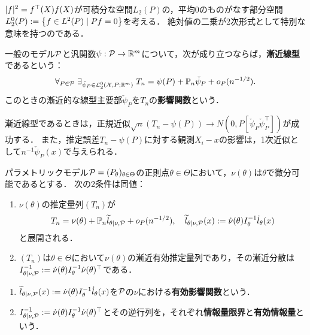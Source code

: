 \documentclass[uplatex,dvipdfmx]{jsreport}
\begin{document}
\begin{notation}
    $\abs{f}^2=f^\top(X) f(X)$が可積分な空間$L_2(P)$の，平均$0$のものがなす部分空間
    $L^0_2(P):=\Brace{f\in L^2(P)\mid Pf=0}$を考える．
    絶対値の二乗が2次形式として特別な意味を持つのである．
\end{notation}

\begin{definition}
    一般のモデル$\P$と汎関数$\psi:\P\to\R^m$について，次が成り立つならば，\textbf{漸近線型}であるという：
    \[\forall_{P\in\P}\;\exists_{\check{\psi}_P\in\L_2^0(\X,P;\R^m)}\;T_n=\psi(P)+\bP_n\check{\psi}_P+o_P(n^{-1/2}).\]
    このときの漸近的な線型主要部$\check{\psi}_P$を$T_n$の\textbf{影響関数}という．
\end{definition}
\begin{remarks}
    漸近線型であるときは，正規近似$\sqrt{n}(T_n-\psi(P))\to N(0,P[\check{\psi}_P\check{\psi}_P^\top])$が成功する．
    また，推定誤差$T_n-\psi(P)$に対する観測$X_i-x$の影響は，1次近似として$n^{-1}\check{\psi}_P(x)$で与えられる．
\end{remarks}

\begin{theorem}[パラメトリックモデルにおける漸近有効性の特徴付け]
    パラメトリックモデル$\P=(P_\theta)_{\theta\in\Theta}$の正則点$\theta\in\Theta$において，$\nu(\theta)$は$\theta$で微分可能であるとする．
    次の2条件は同値：
    \begin{enumerate}
        \item $\nu(\theta)$の推定量列$(T_n)$が
        \[T_n=\nu(\theta)+\bP_n\wt{l}_{\theta|\nu,\P}+o_P(n^{-1/2}),\quad\wt{l}_{\theta|\nu,\P}(x):=\dot{\nu}(\theta)I_\theta^{-1}\dot{l}_\theta(x)\]
        と展開される．
        \item $(T_n)$は$\theta\in\Theta$において$\nu(\theta)$の漸近有効推定量列であり，その漸近分散は$I^{-1}_{\theta|\nu,\P}:=\dot{\nu}(\theta)I^{-1}_\theta\dot{\nu}(\theta)^\top$である．
    \end{enumerate}
\end{theorem}

\begin{definition}\mbox{}
    \begin{enumerate}
        \item $\wt{l}_{\theta|\nu,\P}(x):=\dot{\nu}(\theta)I_\theta^{-1}\dot{l}_\theta(x)$を$\P$の$\nu$における\textbf{有効影響関数}という．
        \item $I^{-1}_{\theta|\nu,\P}:=\dot{\nu}(\theta)I^{-1}_\theta\dot{\nu}(\theta)^\top$とその逆行列を，それぞれ\textbf{情報量限界}と\textbf{有効情報量}という．
    \end{enumerate}
\end{definition}
\end{document}
